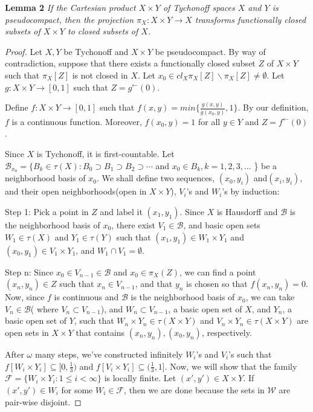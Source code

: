 \documentclass{amsart}
\author{shaun yi cheng}
\begin{document}
\textbf{Lemma 2}
\emph{If the Cartesian product $X\times Y$ of Tychonoff spaces $X$ and $Y$ is pseudocompact, then the projection $\pi_X: X\times Y \rightarrow X$ transforms functionally closed subsets of $X \times Y$ to closed subsets of $X$.}
\begin{proof}
Let $X, Y$ be Tychonoff and $X\times Y$ be pseudocompact. By way of contradiction, suppose that there exists a functionally closed subset $Z$ of $X \times Y$ such that $\pi_X[Z]$ is not closed in $X$. Let $x_0\in cl_X \pi_X[Z] \backslash \pi_X[Z] \neq \emptyset$. Let $g:X\times Y \rightarrow [0,1] $ such that $Z=g^\leftarrow(0)$.

Define $f:X\times Y \rightarrow [0,1] $ such that $f(x,y)=min\{\frac{g(x,y)}{g(x_0,y)},1\}.$
By our definition, $f$ is a continuous function. Moreover, $f(x_0,y)=1 $ for all $y\in Y$ and $Z=f^\leftarrow(0)$.

Since $X$ is Tychonoff, it is first-countable. Let $\mathcal{B}_{x_0}=\{B_k \in \tau(X): 
B_0 \supset B_1 \supset B_2 \supset \cdots $ and $x_0 \in B_k, k=1,2,3,...$ \} be a neighborhood basis of $x_0$.   We shall define two sequences, $(x_0, y_{i})$ and$ (x_i,y_i)$, and their open neighborhoods(open in $X\times Y$), $V_i$'s and $W_i$'s by induction: 

Step 1:  
Pick a point in $Z$ and label it $(x_1,y_1)$. 
Since $X$ is Hausdorff and $\mathcal{B}$ is the neighborhood basis of $x_0$, there exist $V_1 \in \mathcal{B}$, and basic open sets $W_1 \in \tau(X)$ and $Y_1 \in \tau(Y)$ such that  $(x_1,y_1) \in W_1\times Y_1$ and $(x_0,y_1)\in V_1\times Y_1 $, and $W_1 \cap V_1 = \emptyset$. 

Step n: Since $x_0 \in V_{n-1}\in \mathcal{B}$ and $x_0 \in \pi_X(Z)$, we can find a
point $(x_n, y_n) \in Z$ such that $x_n \in V_{n-1}$, and that $y_n$ is chosen so that $f(x_n, y_n)=0$. 
Now, since $f$ is continuous and $\mathcal{B}$ is the neighborhood basis of $x_0$, we can take  $V_n \in \mathcal{B}$( where $V_n \subset V_{n-1}$),  and $W_n \subset V_{n-1}$, a basic open set of $X$, and $Y_n$, a basic open set of $Y$, such that $W_n \times Y_n \in \tau(X\times Y)$ and $V_n \times Y_n \in \tau(X\times Y)$ are open sets in $X\times Y$ that contains $(x_n,y_n), (x_0,y_n)$, respectively. 


After $\omega $ many steps, we've constructed infinitely $W_i$'s and $V_i$'s such that $f[W_i\times Y_i]\subseteq [0,\frac{1}{3})$ and $f[V_i\times Y_i]\subseteq (\frac{1}{3},1]$. 
Now, we will show that the family $\mathcal{F}=\{W_i\times Y_i: 1\leq i < \infty\} $ is locally finite. 
Let $(x',y')\in X\times Y$. If $(x',y')\in W_i$ for some $W_i \in \mathcal{F}$, then we are done because the sets in $\mathcal{W}$ are pair-wise disjoint. 


\end{proof}
\end{document}
